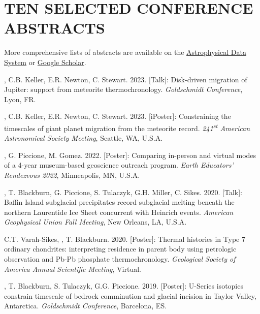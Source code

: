 \section*{TEN SELECTED CONFERENCE ABSTRACTS}

More comprehensive lists of abstracts are available on the \href{https://ui.adsabs.harvard.edu/public-libraries/-tel6KyoTUeLAGPFsPO0dQ}{Astrophysical Data System} or \href{https://scholar.google.com/citations?user=KHLOvgcAAAAJ&hl=en}{Google Scholar}.

\begin{etaremune} [itemsep=4pt, leftmargin=3ex]
  
  \item \ghedwards, C.B. Keller, E.R. Newton, C. Stewart. 2023. [Talk]: Disk-driven migration of Jupiter: support from meteorite thermochronology. \textit{Goldschmidt Conference}, Lyon, FR. 
  
  \item \ghedwards, C.B. Keller,  E.R. Newton, C. Stewart. 2023. [iPoster]: Constraining the timescales of giant planet migration from the meteorite record. \textit{241\textsuperscript{st} American Astronomical Society Meeting}, Seattle, WA, U.S.A.
 
  \item \ghedwards, G. Piccione, M. Gomez. 2022. [Poster]: Comparing in-person and virtual modes of a 4-year museum-based geoscience outreach program. \textit{Earth Educators' Rendezvous 2022}, Minneapolis, MN, U.S.A.
  
  \item \ghedwards, T. Blackburn, G. Piccione, S. Tulaczyk, G.H. Miller, C. Sikes. 2020. [Talk]: Baffin Island subglacial precipitates record subglacial melting beneath the northern Laurentide Ice Sheet concurrent with Heinrich events. \textit{American Geophysical Union Fall Meeting}, New Orleans, LA, U.S.A.
  
  \item C.T. Varah-Sikes, \ghedwards, T. Blackburn. 2020. [Poster]: Thermal histories in Type 7 ordinary chondrites: interpreting residence in parent body using petrologic observation and Pb-Pb phosphate thermochronology. \textit{Geological Society of America Annual Scientific Meeting}, Virtual.
  
  \item  \ghedwards, T. Blackburn, S. Tulaczyk, G.G. Piccione. 2019. [Poster]: U-Series isotopics constrain timescale of bedrock comminution and glacial incision in Taylor Valley, Antarctica. \textit{Goldschmidt Conference}, Barcelona, ES.


\end{etaremune}
